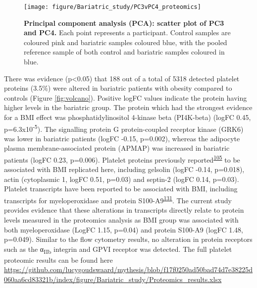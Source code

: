 \documentclass[11pt,twoside]{bristolthesis}
\begin{document}
\begin{figure}

{\centering \texttt{[image: figure/Bariatric\_study/PC3vPC4\_proteomics]} 

}

\caption[Principal component analysis (PCA): scatter plot of PC3 and PC4.]{\textbf{Principal component analysis (PCA): scatter plot of PC3 and PC4.} Each point represents a participant. Control samples are coloured pink and bariatric samples coloured blue, with the pooled reference sample of both control and bariatric samples coloured in blue.}\label{fig:pca2}
\end{figure}
There was evidence (p\textless0.05) that 188 out of a total of 5318 detected platelet proteins (3.5\%) were altered in bariatric patients with obesity compared to controls (Figure \ref{fig:volcano}). Positive logFC values indicate the protein having higher levels in the bariatric group. The protein which had the strongest evidence for a BMI effect was phosphatidylinositol 4-kinase beta (PI4K-beta) (logFC 0.45, p=6.3x10\textsuperscript{-5}). The signalling protein G protein-coupled receptor kinase (GRK6) was lower in bariatric patients (logFC -0.15, p=0.002), whereas the adipocyte plasma membrane-associated protein (APMAP) was increased in bariatric patients (logFC 0.23, p=0.006). Platelet proteins previously reported\textsuperscript{\protect\hyperlink{ref-Barrachina2019}{105}} to be associated with BMI replicated here, including gelsolin (logFC -0.14, p=0.018), actin (cytoplasmic 1, logFC 0.51, p=0.03) and septin-2 (logFC 0.14, p=0.03). Platelet transcripts have been reported to be associated with BMI, including transcripts for myeloperoxidase and protein S100-A9\textsuperscript{\protect\hyperlink{ref-Freedman2010}{131}}. The current study provides evidence that these alterations in transcripts directly relate to protein levels measured in the proteomics analysis as BMI group was associated with both myeloperoxidase (LogFC 1.15, p=0.04) and protein S100-A9 (logFC 1.48, p=0.049). Similar to the flow cytometry results, no alteration in protein receptors such as the α\textsubscript{IIb} integrin and GPVI receptor was detected. The full platelet proteomic results can be found here \url{https://github.com/lucygoudswaard/mythesis/blob/f17f0250ad50bad74d7e38225d060aa6cd83321b/index/figure/Bariatric_study/Proteomics_results.xlsx}
\end{document}
